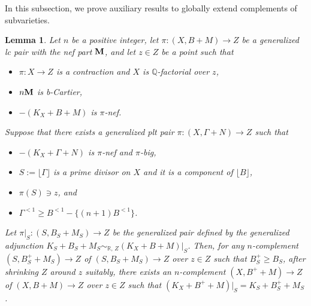 \documentclass[12pt]{amsart}
\newtheorem{lem}[thm]{Lemma}
\theoremstyle{definition}
\begin{document}
In this subsection, we prove auxiliary results to globally extend complements of subvarieties. 

\begin{lem}\label{lem--compl-extend-main}
Let $n$ be a positive integer, let $\pi \colon (X,B+M) \to Z$ be a generalized lc pair with the nef part $\boldsymbol{\rm M}$, and let $z \in Z$ be a point such that
\begin{itemize}
\item
$\pi \colon X \to Z$ is a contraction and $X$ is $\mathbb{Q}$-factorial over $z$, 
\item
$n\boldsymbol{\rm M}$ is b-Cartier, 
\item
$-(K_{X}+B+M)$ is $\pi$-nef.  
\end{itemize}
Suppose that there exists a generalized plt pair $\pi \colon (X,\Gamma+N) \to Z$ such that
\begin{itemize}
\item
$-(K_{X}+\Gamma+N)$ is $\pi$-nef and $\pi$-big,
\item
$S:=\lfloor \Gamma \rfloor$ is a prime divisor on $X$ and it is a component of $\lfloor B \rfloor$, 
\item
$\pi(S) \ni z$, and
\item
$\Gamma^{<1}\geq B^{<1}-\{(n+1)B^{<1}\}$. 
\end{itemize}
Let $\pi|_{S}\colon (S,B_{S}+M_{S}) \to Z$ be the generalized pair defined by the generalized adjunction $K_{S}+B_{S}+M_{S}\sim_{\mathbb{R},\,Z}(K_{X}+B+M)|_{S}$. 
Then, for any $n$-complement $(S,B^{+}_{S}+M_{S}) \to Z$ of $(S,B_{S}+M_{S}) \to Z$ over $z \in Z$ such that $B^{+}_{S} \geq B_{S}$, after shrinking $Z$ around $z$ suitably, there exists an $n$-complement $(X,B^{+}+M) \to Z$  of $(X,B+M) \to Z$ over $z \in Z$ such that $(K_{X}+B^{+}+M)|_{S}=K_{S}+B^{+}_{S}+M_{S}$. 
\end{lem}
\end{document}
